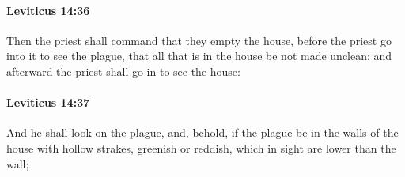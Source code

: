 		\paragraph{Leviticus 14:36} %
			\label{LEVITICUS-14-36}

			Then the priest shall command that they empty the house, before the priest go into it to see the plague, that all that is in the house be not made unclean: and afterward the priest shall go in to see the house:


		\paragraph{Leviticus 14:37} %
			\label{LEVITICUS-14-37}

			And he shall look on the plague, and, behold, if the plague be in the walls of the house with hollow strakes, greenish or reddish, which in sight are lower than the wall;

